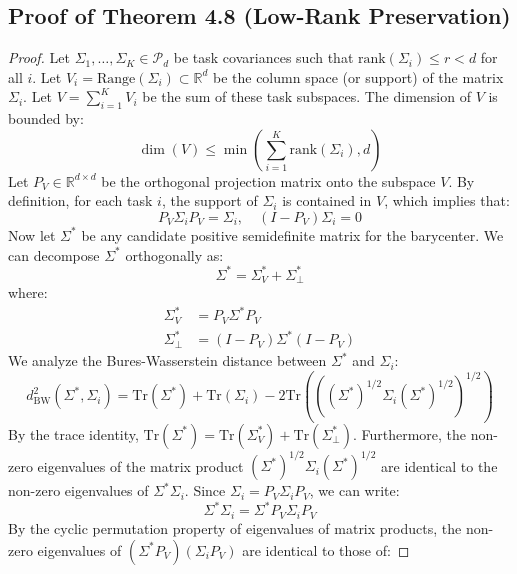 \documentclass{article}
\theoremstyle{plain}
\theoremstyle{definition}
\theoremstyle{remark}
\begin{document}
\subsection{Proof of Theorem 4.8 (Low-Rank Preservation)}
\label{appendix:proof-low-rank}
\begin{proof}
Let $\Sigma_1, \dots, \Sigma_K \in \mathcal{P}_d$ be task covariances such that $\text{rank}(\Sigma_i) \le r < d$ for all $i$.
Let $V_i = \text{Range}(\Sigma_i) \subset \mathbb{R}^d$ be the column space (or support) of the matrix $\Sigma_i$.
Let $V = \sum_{i=1}^K V_i$ be the sum of these task subspaces.
The dimension of $V$ is bounded by:
\begin{equation}
  \dim(V) \le \min \left( \sum_{i=1}^K \text{rank}(\Sigma_i), d \right)
\end{equation}
Let $P_V \in \mathbb{R}^{d \times d}$ be the orthogonal projection matrix onto the subspace $V$.
By definition, for each task $i$, the support of $\Sigma_i$ is contained in $V$, which implies that:
\begin{equation}
  P_V \Sigma_i P_V = \Sigma_i, \quad (I - P_V) \Sigma_i = 0
\end{equation}
Now let $\Sigma^*$ be any candidate positive semidefinite matrix for the barycenter.
We can decompose $\Sigma^*$ orthogonally as:
\begin{equation}
  \Sigma^* = \Sigma^*_V + \Sigma^*_{\perp}
\end{equation}
where:
\begin{align}
  \Sigma^*_V &= P_V \Sigma^* P_V \\
  \Sigma^*_{\perp} &= (I - P_V) \Sigma^* (I - P_V)
\end{align}
We analyze the Bures-Wasserstein distance between $\Sigma^*$ and $\Sigma_i$:
\begin{equation}
  d_{\text{BW}}^2(\Sigma^*, \Sigma_i) = \text{Tr}(\Sigma^*) + \text{Tr}(\Sigma_i) - 2 \text{Tr}\left( \left( (\Sigma^*)^{1/2} \Sigma_i (\Sigma^*)^{1/2} \right)^{1/2} \right)
\end{equation}
By the trace identity, $\text{Tr}(\Sigma^*) = \text{Tr}(\Sigma^*_V) + \text{Tr}(\Sigma^*_{\perp})$.
Furthermore, the non-zero eigenvalues of the matrix product $(\Sigma^*)^{1/2} \Sigma_i (\Sigma^*)^{1/2}$ are identical to the non-zero eigenvalues of $\Sigma^* \Sigma_i$. Since $\Sigma_i = P_V \Sigma_i P_V$, we can write:
\begin{equation}
  \Sigma^* \Sigma_i = \Sigma^* P_V \Sigma_i P_V
\end{equation}
By the cyclic permutation property of eigenvalues of matrix products, the non-zero eigenvalues of $(\Sigma^* P_V) (\Sigma_i P_V)$ are identical to those of:

\end{proof}
\end{document}
